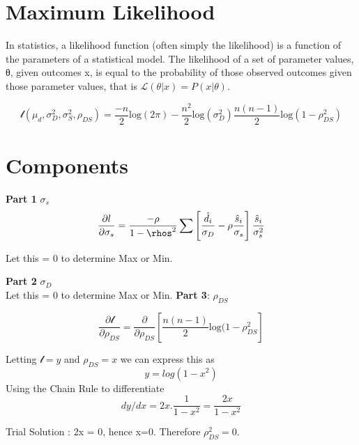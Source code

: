 \section{Maximum Likelihood}

In statistics, a likelihood function (often simply the likelihood) is a function of the parameters of a statistical model. 
The likelihood of a set of parameter values, θ, given outcomes x, is equal to the probability of those 
observed outcomes given those parameter values, that is $\mathcal{L}(\theta |x) = P(x | \theta)$.


\[ \mathcal{l} (\mu_d,\sigma^2_D,\sigma^2_S,\rho_{DS}) = \frac{-n}{2}\mbox{log}(2\pi)  - \frac{n^2}{2}\mbox{log}(\sigma^2_D) 
\frac{n(n-1)}{2}\mbox{log}(1-\rho^2_{DS})

\]

\section{Components}
\newline
\textbf{Part 1} $\sigma_s$ \\

\[ \frac{ \partial l}{\partial \sigma_s}  = \frac{-\rho}{1-\rhos^2} \sum \left[ \frac{\hat{d}_i}{\sigma_D}  -\rho \frac{\hat{s}_i}{\sigma_s} \right] \frac{\hat{s}_i}{\sigma^2_s} \]

Let this = 0 to determine Max or Min.




\newline
\textbf{Part 2} $\sigma_D$ \\






Let this = 0 to determine Max or Min.
\newline
\textbf{Part 3}: $\rho_{DS}$

\[ \frac{\partial \mathcal{l}}{\partial \rho_{DS}} 
  = \frac{\partial }{\partial \rho_{DS}}  \left[ \frac{n(n-1)}{2} \mbox{log}(1-\rho^2_{DS} \right]  \]
  
Letting $\mathcal{l} = y$ and $\rho_{DS}=x$ we can express this as
\[ y = log(1-x^2)\]
Using the Chain Rule to differentiate
\[ dy/dx = 2x. \frac{1}{1-x^2} = \frac{2x}{1-x^2} \] 

Trial Solution : 2x = 0, hence x=0. Therefore $\rho^2_{DS}=0$.



